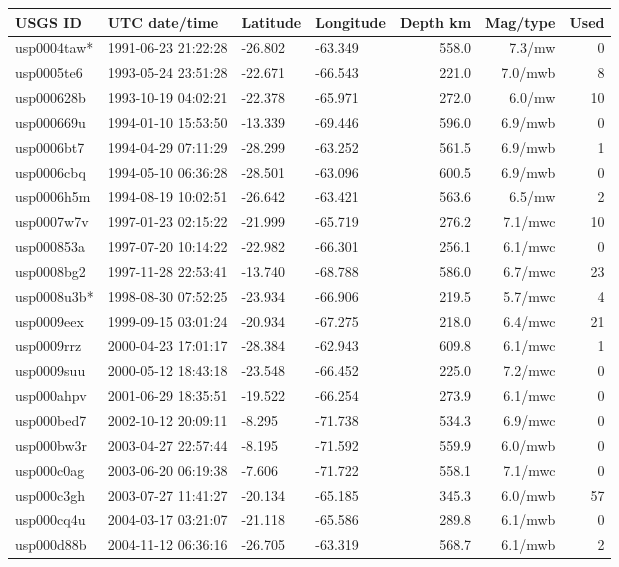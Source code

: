 \documentclass[10pt]{article}
\begin{document}
\begin{longtable}{llllrrr}
\toprule USGS ID & UTC date/time & Latitude & Longitude & Depth km & Mag/type & Used\\\midrule\endhead
usp0004taw* & 1991-06-23 21:22:28 & -26.802 & -63.349 & 558.0 & 7.3/mw & 0 \\
usp0005te6 & 1993-05-24 23:51:28 & -22.671 & -66.543 & 221.0 & 7.0/mwb & 8 \\
usp000628b & 1993-10-19 04:02:21 & -22.378 & -65.971 & 272.0 & 6.0/mw & 10 \\
usp000669u & 1994-01-10 15:53:50 & -13.339 & -69.446 & 596.0 & 6.9/mwb & 0 \\
usp0006bt7 & 1994-04-29 07:11:29 & -28.299 & -63.252 & 561.5 & 6.9/mwb & 1 \\
usp0006cbq & 1994-05-10 06:36:28 & -28.501 & -63.096 & 600.5 & 6.9/mwb & 0 \\
usp0006h5m & 1994-08-19 10:02:51 & -26.642 & -63.421 & 563.6 & 6.5/mw & 2 \\
usp0007w7v & 1997-01-23 02:15:22 & -21.999 & -65.719 & 276.2 & 7.1/mwc & 10 \\
usp000853a & 1997-07-20 10:14:22 & -22.982 & -66.301 & 256.1 & 6.1/mwc & 0 \\
usp0008bg2 & 1997-11-28 22:53:41 & -13.740 & -68.788 & 586.0 & 6.7/mwc & 23 \\
usp0008u3b* & 1998-08-30 07:52:25 & -23.934 & -66.906 & 219.5 & 5.7/mwc & 4 \\
usp0009eex & 1999-09-15 03:01:24 & -20.934 & -67.275 & 218.0 & 6.4/mwc & 21 \\
usp0009rrz & 2000-04-23 17:01:17 & -28.384 & -62.943 & 609.8 & 6.1/mwc & 1 \\
usp0009suu & 2000-05-12 18:43:18 & -23.548 & -66.452 & 225.0 & 7.2/mwc & 0 \\
usp000ahpv & 2001-06-29 18:35:51 & -19.522 & -66.254 & 273.9 & 6.1/mwc & 0 \\
usp000bed7 & 2002-10-12 20:09:11 & -8.295 & -71.738 & 534.3 & 6.9/mwc & 0 \\
usp000bw3r & 2003-04-27 22:57:44 & -8.195 & -71.592 & 559.9 & 6.0/mwb & 0 \\
usp000c0ag & 2003-06-20 06:19:38 & -7.606 & -71.722 & 558.1 & 7.1/mwc & 0 \\
usp000c3gh & 2003-07-27 11:41:27 & -20.134 & -65.185 & 345.3 & 6.0/mwb & 57 \\
usp000cq4u & 2004-03-17 03:21:07 & -21.118 & -65.586 & 289.8 & 6.1/mwb & 0 \\
usp000d88b & 2004-11-12 06:36:16 & -26.705 & -63.319 & 568.7 & 6.1/mwb & 2 \\

\end{longtable}
\end{document}

